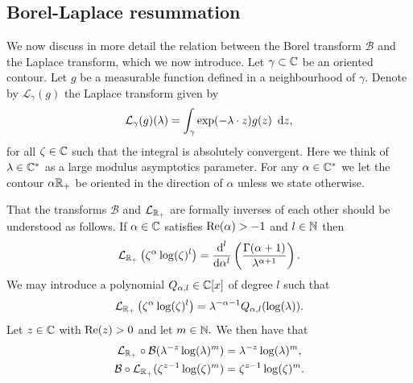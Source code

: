 \subsection{Borel-Laplace resummation}We now discuss in more detail the relation between the Borel transform $\mathcal{B}$ and the Laplace transform, which we now introduce. Let $\gamma \subset \mathbb{C}$ be an oriented contour. Let $g$ be a measurable function defined in a neighbourhood of $\gamma$. Denote by $\mathcal{L}_{\gamma}(g)$ the Laplace transform given by
\begin{equation} \label{eq:Laplacetransform}
\mathcal{L}_\gamma (g) (\lambda) = \int_\gamma \exp(- \lambda \cdot  z ) g(z) \ \operatorname{{d}\hskip-.6mm} z,
\end{equation}
for all $\zeta  \in \mathbb{C}$ such that the integral is absolutely convergent. Here  we think of $\lambda \in \mathbb{C}^*$ as a large modulus asymptotics parameter.
 For any $\alpha \in \mathbb{C}^*$ we let the contour $\alpha \mathbb{R}_+$ be oriented in the direction of $\alpha$ unless we state otherwise.

That the transforms $\mathcal{B}$ and $ \mathcal{L}_{\mathbb{R}_+}$ are formally inverses of each other should be understood as follows. If $\alpha \in \mathbb{C}$ satisfies $\operatorname{Re}(\alpha)>-1$ and $l\in \mathbb{N}$ then
\begin{equation} \label{eq:Laplacedas}
\mathcal{L}_{\mathbb{R}_+}\left(\zeta^{\alpha}\log(\zeta)^l\right)= \frac{\text{d}^l}{\operatorname{{d}\hskip-.6mm} \alpha^l} \left(\frac{\Gamma(\alpha+1)}{\lambda^{\alpha+1}} \right).
\end{equation}
We may introduce a polynomial  $Q_{\alpha,l} \in \mathbb{C}[x]$ of degree $l$ such that
 \begin{equation} \label{eq:Laplacedas2}
 \mathcal{L}_{\mathbb{R}_+}\left(\zeta^{\alpha}\log(\zeta)^l\right)= \lambda^{-\alpha-1}Q_{\alpha,l}(\log(\lambda)).
 \end{equation}
Let $z\in \mathbb{C}$ with $\operatorname{Re}(z)>0$ and let $m \in \mathbb{N}.$ We then have that 
\begin{align} \begin{split}
\label{Formal inverse}
\mathcal{L}_{\mathbb{R}_+}\circ \mathcal{B}(\lambda^{-z}\log(\lambda)^m)&=\lambda^{-z}\log(\lambda)^m, 
\\ \mathcal{B} \circ \mathcal{L}_{\mathbb{R}_+}(\zeta^{z-1}\log(\zeta)^m ) &=\zeta^{z-1}\log(\zeta)^m .
\end{split}
\end{align} 

